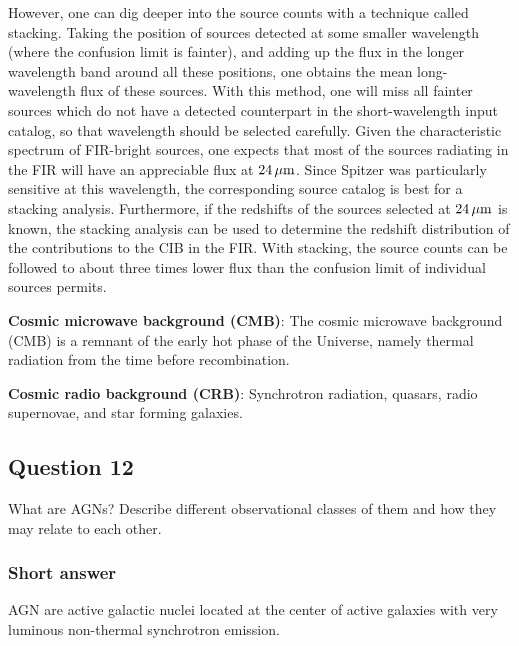 \documentclass[a4paper,11pt]{article}
\begin{document}
{\noindent}However, one can dig deeper into the source counts with a technique called stacking. Taking the position of sources detected at some smaller wavelength (where the confusion limit is fainter), and adding up the flux in the longer wavelength band around all these positions, one obtains the mean long-wavelength flux of these sources. With this method, one will miss all fainter sources which do not have a detected counterpart in the short-wavelength input catalog, so that wavelength should be selected carefully. Given the characteristic spectrum of FIR-bright sources, one expects that most of the sources radiating in the FIR will have an appreciable flux at $24\,\mu{\rm m}$. Since Spitzer was particularly sensitive at this wavelength, the corresponding source catalog is best for a stacking analysis. Furthermore, if the redshifts of the sources selected at $24\,\mu{\rm m}$ is known, the stacking analysis can be used to determine the redshift distribution of the contributions to the CIB in the FIR. With stacking, the source counts can be followed to about three times lower flux than the confusion limit of individual sources permits.

{\noindent}\textbf{Cosmic microwave background (CMB)}: The cosmic microwave background (CMB) is a remnant of the early hot phase of the Universe, namely thermal radiation from the time before recombination. 

{\noindent}\textbf{Cosmic radio background (CRB)}: Synchrotron radiation, quasars, radio supernovae, and star forming galaxies.


\newpage
\subsection{Question 12}

What are AGNs? Describe different observational classes of them and how they may relate to each other.

\subsubsection{Short answer}

AGN are active galactic nuclei located at the center of active galaxies with very luminous non-thermal synchrotron emission. 
\end{document}
